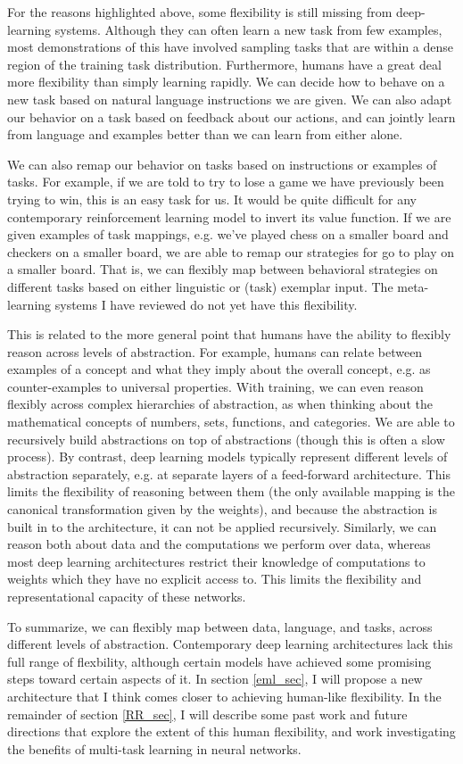 For the reasons highlighted above, some flexibility is still missing from deep-learning systems. Although they can often learn a new task from few examples, most demonstrations of this have involved sampling tasks that are within a dense region of the training task distribution. Furthermore, humans have a great deal more flexibility than simply learning rapidly. We can decide how to behave on a new task based on natural language instructions we are given. We can also adapt our behavior on a task based on feedback about our actions, and can jointly learn from language and examples better than we can learn from either alone. \par
We can also remap our behavior on tasks based on instructions or examples of tasks. For example, if we are told to try to lose a game we have previously been trying to win, this is an easy task for us. It would be quite difficult for any contemporary reinforcement learning model to invert its value function. If we are given examples of task mappings, e.g. we've played chess on a smaller board and checkers on a smaller board, we are able to remap our strategies for go to play on a smaller board. That is, we can flexibly map between behavioral strategies on different tasks based on either linguistic or (task) exemplar input. The meta-learning systems I have reviewed do not yet have this flexibility. \par
This is related to the more general point that humans have the ability to flexibly reason across levels of abstraction. For example, humans can relate between examples of a concept and what they imply about the overall concept, e.g. as counter-examples to universal properties. With training, we can even reason flexibly across complex hierarchies of abstraction, as when thinking about the mathematical concepts of numbers, sets, functions, and categories. We are able to recursively build abstractions on top of abstractions (though this is often a slow process). By contrast, deep learning models typically represent different levels of abstraction separately, e.g. at separate layers of a feed-forward architecture. This limits the flexibility of reasoning between them (the only available mapping is the canonical transformation given by the weights), and because the abstraction is built in to the architecture, it can not be applied recursively. Similarly, we can reason both about data and the computations we perform over data, whereas most deep learning architectures restrict their knowledge of computations to weights which they have no explicit access to. This limits the flexibility and representational capacity of these networks. \par 
To summarize, we can flexibly map between data, language, and tasks, across different levels of abstraction. Contemporary deep learning architectures lack this full range of flexbility, although certain models have achieved some promising steps toward certain aspects of it. In section \ref{eml_sec}, I will propose a new architecture that I think comes closer to achieving human-like flexibility. In the remainder of section \ref{RR_sec}, I will describe some past work and future directions that explore the extent of this human flexibility, and work investigating the benefits of multi-task learning in neural networks. \par 
